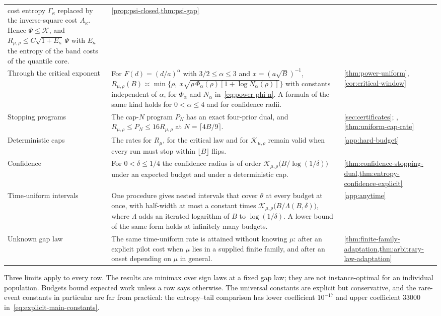 {\begin{longtable}{@{}>{\raggedright\arraybackslash}p{}
                     >{\raggedright\arraybackslash}p{}
                     >{\raggedright\arraybackslash}p{}@{}}
   cost entropy $\Gamma_\kappa$ replaced by the inverse-square cost
   $A_\kappa$. Hence $\Psi\le\mathcal K$, and
   $R_{\mu,\rho}\le C\sqrt{1+E_\kappa}\,\Psi$ with $E_\kappa$ the entropy
   of the band costs of the quantile core.
 & \cref{prop:psi-closed,thm:psi-gap}\\[3pt]
Through the critical exponent
 & For $F(d)=(d/a)^\alpha$ with $3/2\le\alpha\le3$ and $x=(a\sqrt B)^{-1}$,
   $R_{\mu,\rho}(B)\asymp\min\bigl\{\rho,\
   x\sqrt{\rho\,\Phi_\alpha(\rho)[1+\log N_\alpha(\rho)]}\bigr\}$ with
   constants independent of $\alpha$, for $\Phi_\alpha$ and $N_\alpha$
   in~\eqref{eq:power-phi-n}. A formula of the same kind holds for
   $0<\alpha\le4$ and for confidence radii.
 & \cref{thm:power-uniform}, \cref{cor:critical-window}\\[3pt]
Stopping programs
 & The cap-$N$ program $P_N$ has an exact four-prior dual, and
   $R_{\mu,\rho}\le P_N\le16R_{\mu,\rho}$ at $N=\lceil4B/9\rceil$.
 & \cref{sec:certificates}; \crefrange{sec:flow-foundations}{sec:computation}, \cref{thm:uniform-cap-rate}\\[3pt]
Deterministic caps
 & The rates for $R_\mu$, for the critical law and for
   $\mathcal K_{\mu,\rho}$ remain valid when every run must stop within
   $\lfloor B\rfloor$ flips.
 & \cref{app:hard-budget}\\[3pt]
Confidence
 & For $0<\delta\le1/4$ the confidence radius is of order
   $\mathcal K_{\mu,\rho}\bigl(B/\log(1/\delta)\bigr)$ under an expected
   budget and under a deterministic cap.
 & \cref{thm:confidence-stopping-dual,thm:entropy-confidence-explicit}\\[3pt]
Time-uniform intervals
 & One procedure gives nested intervals that cover $\theta$ at every
   budget at once, with half-width at most a constant times
   $\mathcal K_{\mu,\rho}\bigl(B/\Lambda(B,\delta)\bigr)$, where
   $\Lambda$ adds an iterated logarithm of $B$ to $\log(1/\delta)$. A
   lower bound of the same form holds at infinitely many budgets.
 & \cref{app:anytime}\\[3pt]
Unknown gap law
 & The same time-uniform rate is attained without knowing $\mu$: after an
   explicit pilot cost when $\mu$ lies in a supplied finite family, and
   after an onset depending on $\mu$ in general.
 & \cref{thm:finite-family-adaptation,thm:arbitrary-law-adaptation}\\
\bottomrule
\end{longtable}}

Three limits apply to every row. The results are minimax over sign laws at
a fixed gap law; they are not instance-optimal for an individual
population. Budgets bound expected work unless a row says otherwise. The
universal constants are explicit but conservative, and the rare-event
constants in particular are far from practical: the entropy--tail
comparison has lower coefficient $10^{-17}$ and upper coefficient $33000$
in~\eqref{eq:explicit-main-constants}.

